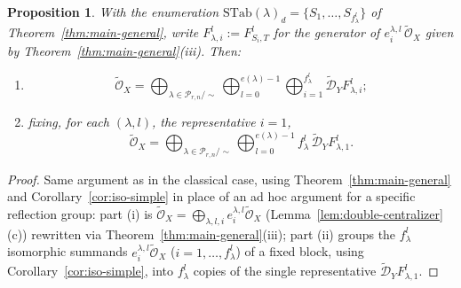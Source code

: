 \documentclass[11pt,a4paper]{article}
\newtheorem{proposition}[theorem]{Proposition}
\begin{document}
\begin{proposition}\label{prop:decomposition-general}
With the enumeration $\mathrm{STab}(\lambda)_d = \{S_1,\dots,S_{f^l_\lambda}\}$
of Theorem~\ref{thm:main-general}, write
$F^l_{\lambda,i} := F^l_{S_i,T}$ for the generator of
$e^{\lambda,l}_i\,\widetilde{\mathcal O}_X$ given by
Theorem~\ref{thm:main-general}(iii). Then:
\begin{enumerate}[label=(\roman*)]
\item
\[
 \widetilde{\mathcal{O}}_X
 = \bigoplus_{\lambda \in \mathcal{P}_{r,n}/\sim} \bigoplus_{l=0}^{e(\lambda)-1}
 \bigoplus_{i=1}^{f^l_\lambda} \widetilde{\mathcal{D}}_Y F^l_{\lambda,i} ;
\]
\item fixing, for each $(\lambda,l)$, the representative $i=1$,
\[
 \widetilde{\mathcal{O}}_X
 = \bigoplus_{\lambda \in \mathcal{P}_{r,n}/\sim} \bigoplus_{l=0}^{e(\lambda)-1}
 f^l_\lambda \, \widetilde{\mathcal{D}}_Y F^l_{\lambda,1}.
\]
\end{enumerate}
\end{proposition}

\begin{proof}
Same argument as in the classical case, using
Theorem~\ref{thm:main-general} and Corollary~\ref{cor:iso-simple} in
place of an ad hoc argument for a specific reflection group: part (i)
is $\widetilde{\mathcal O}_X = \bigoplus_{\lambda,l,i} e^{\lambda,l}_i \widetilde{\mathcal O}_X$
(Lemma~\ref{lem:double-centralizer}(c)) rewritten via
Theorem~\ref{thm:main-general}(iii); part (ii) groups the
$f^l_\lambda$ isomorphic summands $e^{\lambda,l}_i\widetilde{\mathcal O}_X$
($i=1,\dots,f^l_\lambda$) of a fixed block, using
Corollary~\ref{cor:iso-simple}, into $f^l_\lambda$ copies of the single
representative $\widetilde{\mathcal D}_Y F^l_{\lambda,1}$.
\end{proof}
\end{document}
